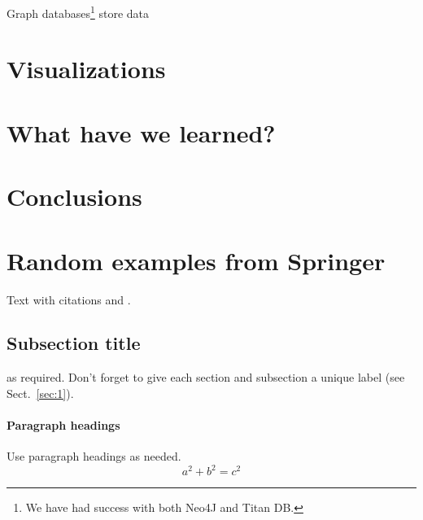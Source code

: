 Graph databases\footnote{We have had success with both 
	Neo4J and Titan DB.} store data

\section{Visualizations}
\label{sec:visualizations}

\section{What have we learned?}
\label{sec:learned}

\section{Conclusions}
\label{sec:conclusions}


\section*{Random examples from Springer}


Text with citations \cite{RefB} and \cite{RefJ}.

\subsection{Subsection title}
\label{sec:2}
as required. Don't forget to give each section
and subsection a unique label (see Sect.~\ref{sec:1}).
\paragraph{Paragraph headings} Use paragraph headings as needed.
\begin{equation}
a^2+b^2=c^2
\end{equation}


